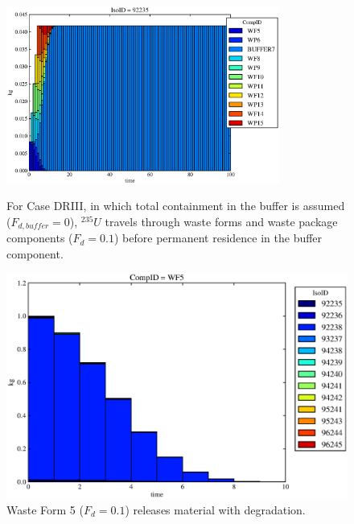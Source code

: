 \begin{figure}[ht]
\centering
\includegraphics[width=0.8\textwidth]{./chapters/demonstration/base/drIII.eps}
\caption[$^{235}U$ residence. Degradation Rate Buffer No Release.]{
For Case DRIII, in which total containment in the buffer is assumed ($F_{d,buffer}=0$), 
$^{235}U$ travels through waste forms and waste package components ($F_d = 0.1$) before 
permanent residence in the buffer component.
}
\label{fig:drIIIall}
\begin{minipage}[b]{0.45\linewidth}

  \includegraphics[width=\textwidth]{./chapters/demonstration/base/drIII1.eps}
  \caption[DRIII Waste Form Contaminants.]{
    Waste Form 5 ($F_d = 0.1$) releases material with degradation. 
    }
  \label{fig:drIIIwf5}
  

\end{minipage}
\end{figure}
